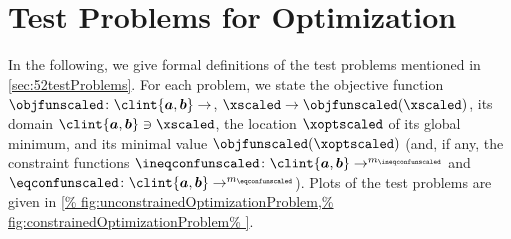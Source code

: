 \chapter{Test Problems for Optimization}
\label{chap:a20testProblems}

In the following, we give formal definitions of the test problems
mentioned in \cref{sec:52testProblems}.
For each problem, we state the objective function
$\objfunscaled\colon \clint{\*a, \*b} \to \real$,
$\xscaled \to \objfunscaled(\xscaled)$,
its domain $\clint{\*a, \*b} \ni \xscaled$,
the location $\xoptscaled$ of its global minimum, and
its minimal value $\objfunscaled(\xoptscaled)$
(and, if any, the constraint functions
$\ineqconfunscaled\colon \clint{\*a, \*b} \to \real^{m_{\ineqconfunscaled}}$
and $\eqconfunscaled\colon \clint{\*a, \*b} \to \real^{m_{\eqconfunscaled}}$).
Plots of the test problems are given in
\cref{%
  fig:unconstrainedOptimizationProblem,%
  fig:constrainedOptimizationProblem%
}.

{
  \newcommand*{\centertestfunline}[1]{%
    \mathclap{\hphantom{\mathrm{(B.99a)}}#1}%
  }
  
  
  
}

\cleardoublepage
